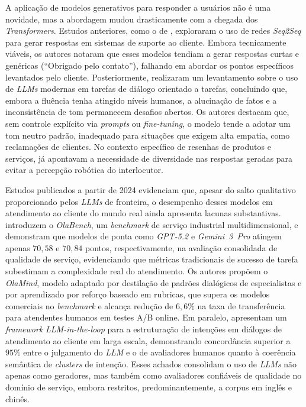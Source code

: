 \documentclass[12pt, a4paper]{article}
\numberwithin{equation}{section}
\begin{document}
A aplicação de modelos generativos para responder a usuários não é uma novidade, mas a abordagem mudou drasticamente com a chegada dos \textit{Transformers}. Estudos anteriores, como o de \cite{fu2020context}, exploraram o uso de redes \textit{Seq2Seq} para gerar respostas em sistemas de suporte ao cliente. Embora tecnicamente viáveis, os autores notaram que esses modelos tendiam a gerar respostas curtas e genéricas (``Obrigado pelo contato''), falhando em abordar os pontos específicos levantados pelo cliente. Posteriormente, \cite{hu2023survey} realizaram um levantamento sobre o uso de \textit{LLMs} modernas em tarefas de diálogo orientado a tarefas, concluindo que, embora a fluência tenha atingido níveis humanos, a alucinação de fatos e a inconsistência de tom permanecem desafios abertos. Os autores destacam que, sem controle explícito via \textit{prompts} ou \textit{fine-tuning}, o modelo tende a adotar um tom neutro padrão, inadequado para situações que exigem alta empatia, como reclamações de clientes. No contexto específico de resenhas de produtos e serviços, \cite{li2016diversity} já apontavam a necessidade de diversidade nas respostas geradas para evitar a percepção robótica do interlocutor.

Estudos publicados a partir de 2024 evidenciam que, apesar do salto qualitativo proporcionado pelos \textit{LLMs} de fronteira, o desempenho desses modelos em atendimento ao cliente do mundo real ainda apresenta lacunas substantivas.  introduzem o \textit{OlaBench}, um \textit{benchmark} de serviço industrial multidimensional, e demonstram que modelos de ponta como \textit{GPT-5.2} e \textit{Gemini~3~Pro} atingem apenas $70{,}58$ e $70{,}84$ pontos, respectivamente, na avaliação consolidada de qualidade de serviço, evidenciando que métricas tradicionais de sucesso de tarefa subestimam a complexidade real do atendimento. Os autores propõem o \textit{OlaMind}, modelo adaptado por destilação de padrões dialógicos de especialistas e por aprendizado por reforço baseado em rubricas, que supera os modelos comerciais no \textit{benchmark} e alcança redução de $6{,}6\%$ na taxa de transferência para atendentes humanos em testes A/B online. Em paralelo,  apresentam um \textit{framework} \textit{LLM-in-the-loop} para a estruturação de intenções em diálogos de atendimento ao cliente em larga escala, demonstrando concordância superior a $95\%$ entre o julgamento do \textit{LLM} e o de avaliadores humanos quanto à coerência semântica de \textit{clusters} de intenção. Esses achados consolidam o uso de \textit{LLMs} não apenas como geradores, mas também como avaliadores confiáveis de qualidade no domínio de serviço, embora restritos, predominantemente, a corpus em inglês e chinês.
\end{document}
